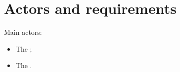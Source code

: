 \chapter{Actors and requirements}\label{ch:requirements}

Main actors:
\begin{itemize}
	\item The ;
	\item The .
\end{itemize}



